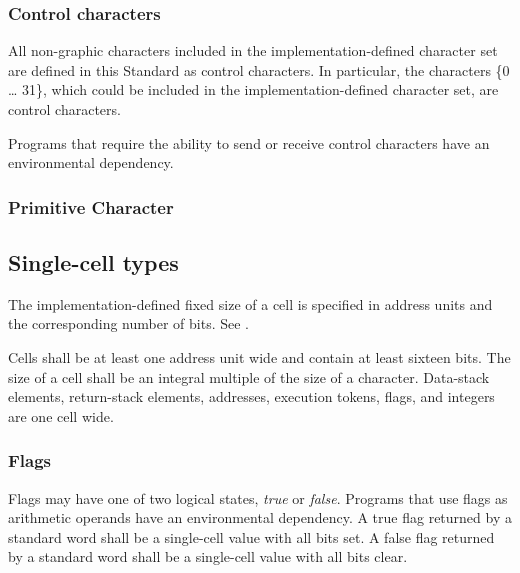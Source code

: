 \subsubsection{Control characters} %
\label{usage:control}

All non-graphic characters included in the implementation-defined
character set are defined in this Standard as control characters.
In particular, the characters \{0 {\ldots} 31\}, which could be
included in the implementation-defined character set, are control
characters.

Programs that require the ability to send or receive control
characters have an environmental dependency.

\subsubsection{Primitive Character} %
\label{usage:pchar}


\subsection{Single-cell types} %
\label{usage:cell}

The implementation-defined fixed size of a cell is specified in
address units and the corresponding number of bits.
See .

Cells shall be at least one address unit wide and contain at least
sixteen bits. The size of a cell shall be an integral multiple of
the size of a character. Data-stack elements, return-stack elements,
addresses, execution tokens, flags, and integers are one cell wide.

\subsubsection{Flags} %
\label{usage:flags}

Flags may have one of two logical states, \emph{true} or \emph{false}.
Programs that use flags as arithmetic operands have an environmental
dependency. A true flag returned by a standard word shall be a
single-cell value with all bits set. A false flag returned by a
standard word shall be a single-cell value with all bits clear.

